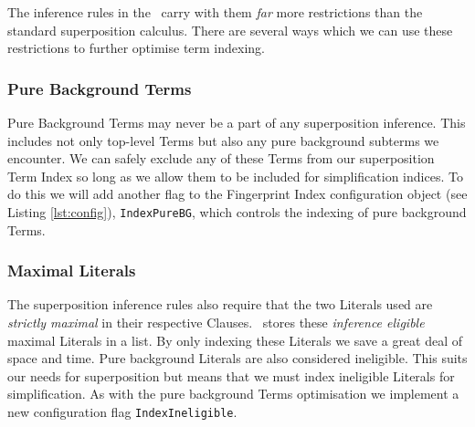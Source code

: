 The inference rules in the \HSWAC\ carry with them \emph{far} more restrictions
than the standard superposition calculus. There are several ways which we can
use these restrictions to further optimise term indexing.

\subsubsection{Pure Background Terms}
Pure Background Terms may never be a part of any superposition inference.
This includes not only top-level Terms but also any pure background subterms we encounter.
We can safely exclude any of these Terms from our superposition Term Index so long as we allow them to
be included for simplification indices. To do this we will add another flag
to the Fingerprint Index configuration object (see Listing \ref{lst:config}),
\verb!IndexPureBG!, which controls the indexing of pure background Terms.

\subsubsection{Maximal Literals}
The superposition inference rules also require that the two Literals used are
\emph{strictly maximal} in their respective Clauses. \Beagle\ stores these
\emph{inference eligible} maximal Literals in a list. By only indexing these
Literals we save a great deal of space and time. Pure background Literals
are also considered ineligible. This suits our needs for superposition but means
that we must index ineligible Literals for simplification. As with the pure background Terms
optimisation we implement a new configuration flag \verb!IndexIneligible!.
